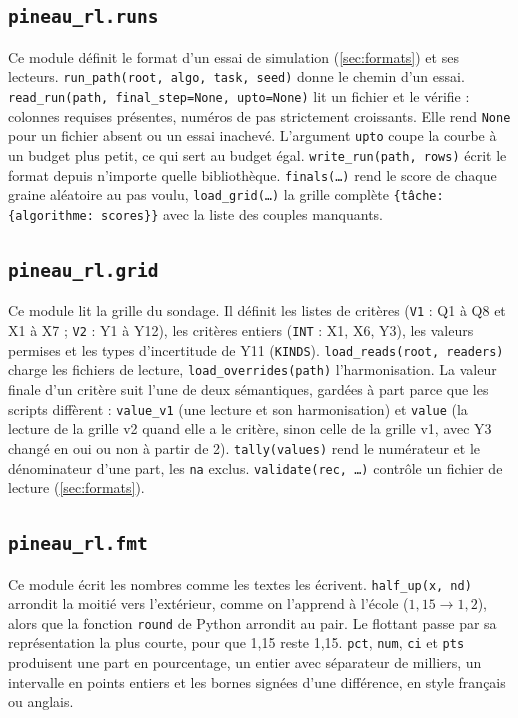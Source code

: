 \subsection{\texttt{pineau\_rl.runs}}

Ce module définit le format d'un essai de simulation (\cref{sec:formats}) et ses lecteurs.
\texttt{run\_path(root, algo, task, seed)} donne le chemin d'un essai. \texttt{read\_run(path,
final\_step=None, upto=None)} lit un fichier et le vérifie : colonnes requises présentes, numéros de pas
strictement croissants. Elle rend \texttt{None} pour un fichier absent ou un essai inachevé. L'argument
\texttt{upto} coupe la courbe à un budget plus petit, ce qui sert au budget égal.
\texttt{write\_run(path, rows)} écrit le format depuis n'importe quelle bibliothèque.
\texttt{finals(\dots)} rend le score de chaque graine aléatoire au pas voulu, \texttt{load\_grid(\dots)} la
grille complète \texttt{\{tâche: \{algorithme: scores\}\}} avec la liste des couples manquants.

\subsection{\texttt{pineau\_rl.grid}}

Ce module lit la grille du sondage. Il définit les listes de critères (\texttt{V1} : Q1 à Q8 et X1
à X7 ; \texttt{V2} : Y1 à Y12), les critères entiers (\texttt{INT} : X1, X6, Y3), les valeurs
permises et les types d'incertitude de Y11 (\texttt{KINDS}).
\texttt{load\_reads(root, readers)} charge les fichiers de lecture,
\texttt{load\_overrides(path)} l'harmonisation. La valeur finale d'un critère suit l'une de deux
sémantiques, gardées à part parce que les scripts diffèrent : \texttt{value\_v1} (une lecture et
son harmonisation) et \texttt{value} (la lecture de la grille v2 quand elle a le critère, sinon celle
de la grille v1, avec Y3 changé en oui ou non à partir de 2). \texttt{tally(values)} rend le
numérateur et le dénominateur d'une part, les \texttt{na} exclus. \texttt{validate(rec, \dots)}
contrôle un fichier de lecture (\cref{sec:formats}).

\subsection{\texttt{pineau\_rl.fmt}}

Ce module écrit les nombres comme les textes les écrivent. \texttt{half\_up(x, nd)} arrondit la
moitié vers l'extérieur, comme on l'apprend à l'école ($1{,}15 \to 1{,}2$), alors que la fonction
\texttt{round} de Python arrondit au pair. Le flottant passe par sa représentation la plus courte,
pour que 1,15 reste 1,15. \texttt{pct}, \texttt{num}, \texttt{ci} et \texttt{pts} produisent une
part en pourcentage, un entier avec séparateur de milliers, un intervalle en points entiers et les
bornes signées d'une différence, en style français ou anglais.

